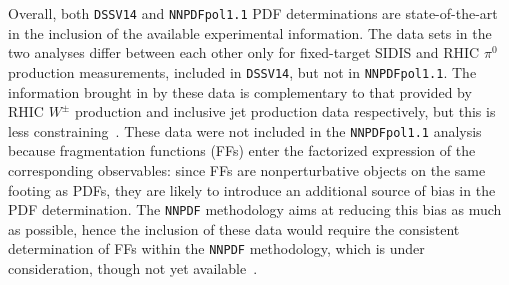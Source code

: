 Overall, both {\tt DSSV14} and {\tt NNPDFpol1.1} PDF determinations are 
state-of-the-art in the inclusion of the available experimental information. 
The data sets in the two analyses differ between each other only for 
fixed-target SIDIS and RHIC $\pi^0$ production measurements, included in 
{\tt DSSV14}, but not in {\tt NNPDFpol1.1}. The information brought in by 
these data is complementary to that provided by RHIC $W^\pm$ production and 
inclusive jet production data respectively, but this is less 
constraining~\cite{Nocera:2014gqa}. These data were not included in the 
{\tt NNPDFpol1.1} analysis because fragmentation functions (FFs) enter the 
factorized expression of the corresponding observables: since FFs are 
nonperturbative objects on the same footing as PDFs, they are likely to 
introduce an additional source of bias in the PDF determination. The
{\tt NNPDF} methodology aims at reducing this bias as much as possible, hence 
the inclusion of these data would require the consistent determination 
of FFs within the {\tt NNPDF} methodology, which is under consideration,
though not yet available~\cite{Bertone:2015cwa}. 

